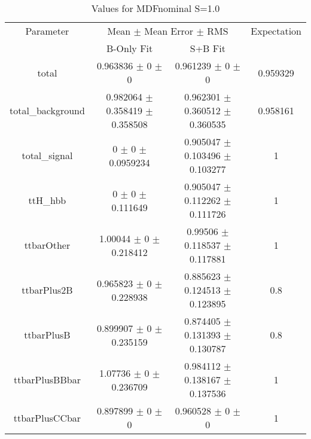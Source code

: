 \begin{table}
\centering
\caption{Values for MDFnominal S=1.0}
\begin{tabular}{cccc}
\toprule
Parameter & \multicolumn{2}{c}{Mean $\pm$ Mean Error $\pm$ RMS} & Expectation\\
 & B-Only Fit & S+B Fit & \\
\midrule
total & \num{0.963836} $\pm$ \num{0} $\pm$ \num{0} & \num{0.961239} $\pm$ \num{0} $\pm$ \num{0} & \num{0.959329}\\
total\_background & \num{0.982064} $\pm$ \num{0.358419} $\pm$ \num{0.358508} & \num{0.962301} $\pm$ \num{0.360512} $\pm$ \num{0.360535} & \num{0.958161}\\
total\_signal & \num{0} $\pm$ \num{0} $\pm$ \num{0.0959234} & \num{0.905047} $\pm$ \num{0.103496} $\pm$ \num{0.103277} & \num{1}\\
ttH\_hbb & \num{0} $\pm$ \num{0} $\pm$ \num{0.111649} & \num{0.905047} $\pm$ \num{0.112262} $\pm$ \num{0.111726} & \num{1}\\
ttbarOther & \num{1.00044} $\pm$ \num{0} $\pm$ \num{0.218412} & \num{0.99506} $\pm$ \num{0.118537} $\pm$ \num{0.117881} & \num{1}\\
ttbarPlus2B & \num{0.965823} $\pm$ \num{0} $\pm$ \num{0.228938} & \num{0.885623} $\pm$ \num{0.124513} $\pm$ \num{0.123895} & \num{0.8}\\
ttbarPlusB & \num{0.899907} $\pm$ \num{0} $\pm$ \num{0.235159} & \num{0.874405} $\pm$ \num{0.131393} $\pm$ \num{0.130787} & \num{0.8}\\
ttbarPlusBBbar & \num{1.07736} $\pm$ \num{0} $\pm$ \num{0.236709} & \num{0.984112} $\pm$ \num{0.138167} $\pm$ \num{0.137536} & \num{1}\\
ttbarPlusCCbar & \num{0.897899} $\pm$ \num{0} $\pm$ \num{0} & \num{0.960528} $\pm$ \num{0} $\pm$ \num{0} & \num{1}\\
\bottomrule
\end{tabular}
\end{table}